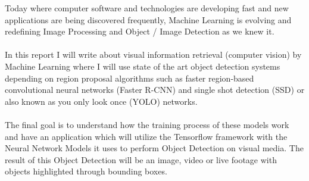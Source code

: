 
Today where computer software and technologies are developing fast and new applications are being discovered frequently, Machine
Learning is evolving and redefining Image Processing and Object / Image Detection as we knew it.\\ \\
In this report I will write about visual information retrieval (computer vision) by Machine Learning where I will use state of the art
object detection systems depending on region proposal algorithms such as faster region-based convolutional neural networks (Faster R-CNN)
and single shot detection (SSD) or also known as you only look once (YOLO) networks.\\ \\
The final goal is to understand how the training process of these models work and have an application which will utilize the Tensorflow
framework with the Neural Network Models it uses to perform Object Detection on visual media. The result of this Object Detection will be an
image, video or live footage with objects highlighted through bounding boxes.

